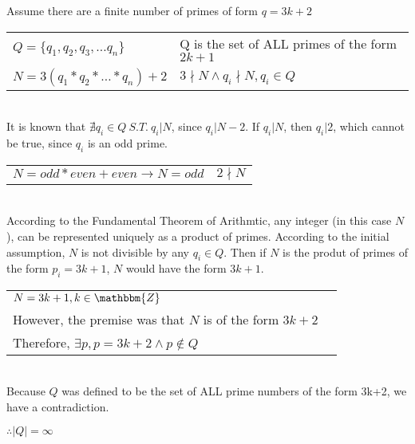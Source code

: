 \documentclass[11pt]{article}
\def\AND{\wedge}
\def\imp{\rightarrow}
\begin{document}
\begin{enumerate}
		Assume there are a finite number of primes of form $q = 3k + 2$ \\

		\begin{tabular}{ll}

			$Q = \{q_1, q_2, q_3, \dots q_n\}$ & Q is the set of ALL primes of 
							     the form $2k + 1$ \\

			$N = 3(q_1*q_2*\dots*q_n)+2$ & $3 \nmid N \AND q_i \nmid N, q_i \in Q$ \\ 

		\end{tabular} \\

		It is known that $\nexists q_i \in Q\ S.T.\ q_i | N$, since $q_i | N-2$.
		If $q_i | N$, then $q_i | 2$, which cannot be true, since $q_i$ is an odd prime.

		\begin{tabular}{ll}

			$N = odd * even + even \imp N = odd$ & $2 \nmid N$ \\
			
		\end{tabular} \\

		According to the Fundamental Theorem of Arithmtic, any integer (in this case $N$), 
		can be represented uniquely as a product of primes. According to the initial
		assumption, $N$ is not divisible by any $q_i \in Q$. Then if $N$ is the produt of 
		primes of the form $p_i = 3k + 1$, $N$ would have the form $3k+1$.

		\begin{tabular}{ll}

			$N = 3k + 1, k \in \mathbbm{Z}$ \\

			However, the premise was that $N$ is of the form $3k + 2$ \\

			Therefore, $\exists p, p = 3k + 2 \AND p \not\in Q$ \\

		\end{tabular} \\

		Because $Q$ was defined to be the set of ALL prime numbers of the form 3k+2, we
		have a contradiction. 

		$\therefore |Q| = \infty$ \\

		\newpage


\end{enumerate}
\end{document}
